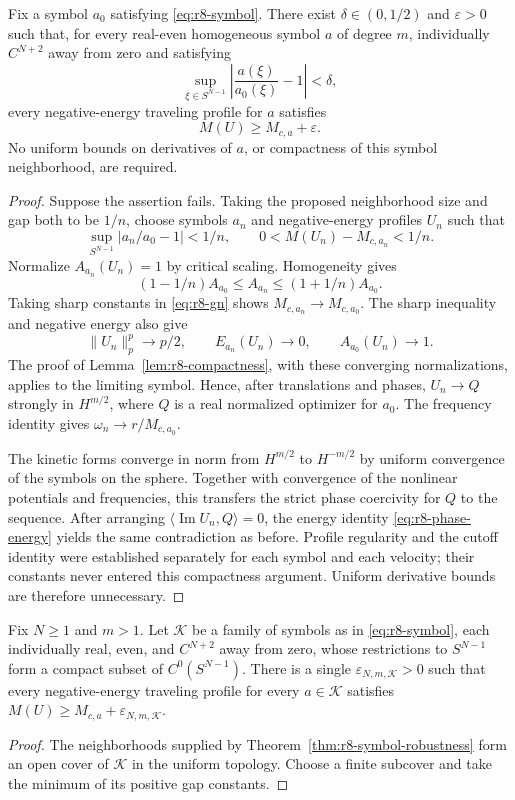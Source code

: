 \begin{theorem}
\label{thm:r8-symbol-robustness}
Fix a symbol $a_0$ satisfying \eqref{eq:r8-symbol}.
There exist $\delta\in(0,1/2)$ and $\varepsilon>0$ such that, for every
real-even homogeneous symbol $a$ of degree $m$, individually
$C^{N+2}$ away from zero and satisfying
\[
 \sup_{\xi\in S^{N-1}}\left|\frac{a(\xi)}{a_0(\xi)}-1\right|
 <\delta,
\]
every negative-energy traveling profile for $a$ satisfies
\[
 M(U)\ge M_{c,a}+\varepsilon.
\]
No uniform bounds on derivatives of $a$, or compactness of this
symbol neighborhood, are required.
\end{theorem}
\begin{proof}
Suppose the assertion fails. Taking the proposed neighborhood size
and gap both to be $1/n$, choose symbols $a_n$ and
negative-energy profiles $U_n$ such that
\[
 \sup_{S^{N-1}}|a_n/a_0-1|<1/n,\qquad
 0<M(U_n)-M_{c,a_n}<1/n.
\]
Normalize $A_{a_n}(U_n)=1$ by critical scaling.
Homogeneity gives
\[
 (1-1/n)A_{a_0}\le A_{a_n}
 \le(1+1/n)A_{a_0}.
\]
Taking sharp constants in \eqref{eq:r8-gn} shows
$M_{c,a_n}\to M_{c,a_0}$.
The sharp inequality and negative energy also give
\[
 \|U_n\|_p^p\to p/2,\qquad E_{a_n}(U_n)\to0,\qquad
 A_{a_0}(U_n)\to1.
\]
The proof of Lemma~\ref{lem:r8-compactness}, with these converging
normalizations, applies to the limiting symbol. Hence, after
translations and phases, $U_n\to Q$ strongly in $H^{m/2}$,
where $Q$ is a real normalized optimizer for $a_0$.
The frequency identity gives $\omega_n\to r/M_{c,a_0}$.

The kinetic forms converge in norm from $H^{m/2}$ to $H^{-m/2}$
by uniform convergence of the symbols on the sphere.
Together with convergence of the nonlinear potentials and
frequencies, this transfers the strict phase coercivity for $Q$
to the sequence. After arranging
$\langle\operatorname{Im}U_n,Q\rangle=0$, the energy identity
\eqref{eq:r8-phase-energy} yields the same contradiction as before.
Profile regularity and the cutoff identity were established separately
for each symbol and each velocity; their constants never entered this
compactness argument. Uniform derivative bounds are therefore
unnecessary.
\end{proof}

\begin{proposition}\label{thm:r8-symbol-family}
Fix $N\ge1$ and $m>1$. Let $\mathcal K$ be a family of symbols
as in \eqref{eq:r8-symbol}, each individually real, even, and
$C^{N+2}$ away from zero, whose restrictions to $S^{N-1}$ form
a compact subset of $C^0(S^{N-1})$.
There is a single $\varepsilon_{N,m,\mathcal K}>0$ such that every
negative-energy traveling profile for every $a\in\mathcal K$
satisfies $M(U)\ge M_{c,a}+\varepsilon_{N,m,\mathcal K}$.
\end{proposition}
\begin{proof}
The neighborhoods supplied by
Theorem~\ref{thm:r8-symbol-robustness} form an open cover of
$\mathcal K$ in the uniform topology. Choose a finite subcover
and take the minimum of its positive gap constants.
\end{proof}

